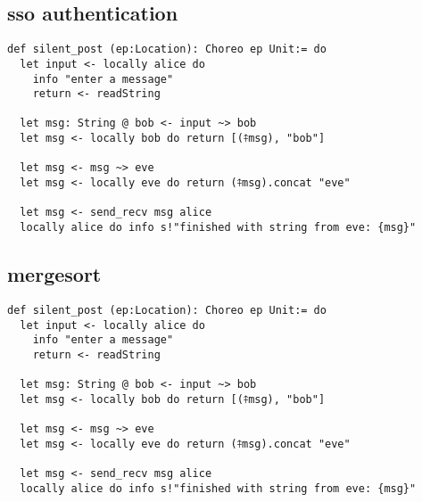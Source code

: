\subsection{sso authentication}
\label{ss:sso}

\begin{lstlisting}[language=lean]
def silent_post (ep:Location): Choreo ep Unit:= do
  let input <- locally alice do
    info "enter a message"
    return <- readString

  let msg: String @ bob <- input ~> bob
  let msg <- locally bob do return [(⤉msg), "bob"]

  let msg <- msg ~> eve
  let msg <- locally eve do return (⤉msg).concat "eve"

  let msg <- send_recv msg alice
  locally alice do info s!"finished with string from eve: {msg}"
\end{lstlisting}

\subsection{mergesort}
\label{ss:merge}

\begin{lstlisting}[language=lean]
def silent_post (ep:Location): Choreo ep Unit:= do
  let input <- locally alice do
    info "enter a message"
    return <- readString

  let msg: String @ bob <- input ~> bob
  let msg <- locally bob do return [(⤉msg), "bob"]

  let msg <- msg ~> eve
  let msg <- locally eve do return (⤉msg).concat "eve"

  let msg <- send_recv msg alice
  locally alice do info s!"finished with string from eve: {msg}"
\end{lstlisting}
